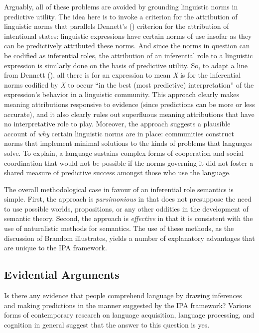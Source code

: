 Arguably, all of these problems are avoided by grounding linguistic norms in predictive utility. The idea here is to invoke a criterion for the attribution of linguistic norms that parallels Dennett's (\citeyear{Dennett:1987}) criterion for the attribution of intentional states: linguistic expressions have certain norms of use insofar as they can be predictively attributed these norms. And since the norms in question can be codified as inferential roles, the attribution of an inferential role to a linguistic expression is similarly done on the basis of predictive utility. So, to adapt a line from Dennett (\citeyear[][p. 29]{Dennett:1987}), all there is for an expression to mean \textit{X} is for the inferential norms codified by \textit{X} to occur ``in the best (most predictive) interpretation'' of the expression's behavior in a linguistic community. This approach clearly makes meaning attributions responsive to evidence (since predictions can be more or less accurate), and it also clearly rules out superfluous meaning attributions that have no interpretative role to play. Moreover, the approach suggests a plausible account of \textit{why} certain linguistic norms are in place: communities construct norms that implement minimal solutions to the kinds of problems that languages solve. To explain, a language sustains complex forms of cooperation and social coordination that would not be possible if the norms governing it did not foster a shared measure of predictive success amongst those who use the language.

The overall methodological case in favour of an inferential role semantics is simple. First, the approach is \textit{parsimonious} in that does not presuppose the need to use possible worlds, propositions, or any other oddities in the development of semantic theory. Second, the approach is \textit{effective} in that it is consistent with the use of naturalistic methods for semantics. The use of these methods, as the discussion of Brandom illustrates, yields a number of explanatory advantages that are unique to the IPA framework.

\subsection{Evidential Arguments}

Is there any evidence that people comprehend language by drawing inferences and making predictions in the manner suggested by the IPA framework? Various forms of contemporary research on language acquisition, language processing, and cognition in general suggest that the answer to this question is yes.

